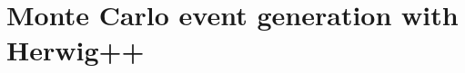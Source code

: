 \documentclass[twoside,english]{uiofysmaster}
\begin{document}


\newpage

\section{Monte Carlo event generation with {\ttfamily Herwig++}}
\end{document}
